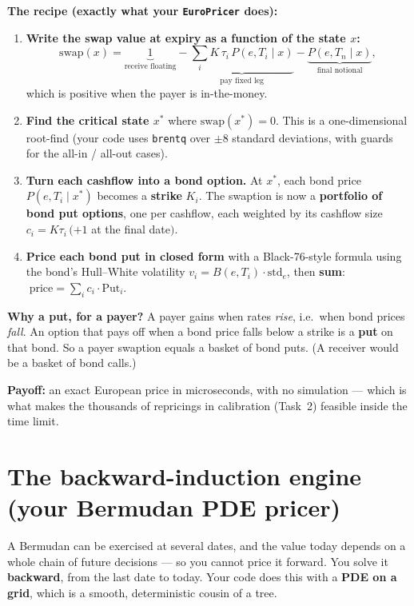 \documentclass[11pt]{article}
\newcommand{\code}[1]{\texttt{#1}}
\begin{document}
\textbf{The recipe (exactly what your \code{EuroPricer} does):}
\begin{enumerate}[leftmargin=1.6em]
  \item \textbf{Write the swap value at expiry as a function of the state $x$:}
        \[
          \text{swap}(x) = \underbrace{1}_{\text{receive floating}}
            - \underbrace{\sum_i K\,\tau_i\,P(e,T_i\mid x)}_{\text{pay fixed leg}}
            - \underbrace{P(e,T_n\mid x)}_{\text{final notional}},
        \]
        which is positive when the payer is in-the-money.
  \item \textbf{Find the critical state $x^\ast$} where $\text{swap}(x^\ast)=0$. This is a
        one-dimensional root-find (your code uses \code{brentq} over $\pm 8$ standard
        deviations, with guards for the all-in / all-out cases).
  \item \textbf{Turn each cashflow into a bond option.} At $x^\ast$, each bond price
        $P(e,T_i\mid x^\ast)$ becomes a \textbf{strike} $K_i$. The swaption is now a
        \textbf{portfolio of bond put options}, one per cashflow, each weighted by its
        cashflow size $c_i = K\tau_i\,(+1$ at the final date$)$.
  \item \textbf{Price each bond put in closed form} with a Black-76-style formula using the
        bond's Hull--White volatility $v_i = B(e,T_i)\cdot\text{std}_e$, then \textbf{sum}:
        $\;\text{price} = \sum_i c_i \cdot \text{Put}_i$.
\end{enumerate}

\textbf{Why a put, for a payer?} A payer gains when rates \emph{rise}, i.e.\ when bond
prices \emph{fall}. An option that pays off when a bond price falls below a strike is a
\textbf{put} on that bond. So a payer swaption equals a basket of bond puts. (A receiver
would be a basket of bond calls.)

\textbf{Payoff:} an exact European price in microseconds, with no simulation --- which is
what makes the thousands of repricings in calibration (Task~2) feasible inside the time
limit.

\section{The backward-induction engine (your Bermudan PDE pricer)}

A Bermudan can be exercised at several dates, and the value today depends on a whole
chain of future decisions --- so you cannot price it forward. You solve it
\textbf{backward}, from the last date to today. Your code does this with a \textbf{PDE on a
grid}, which is a smooth, deterministic cousin of a tree.
\end{document}
